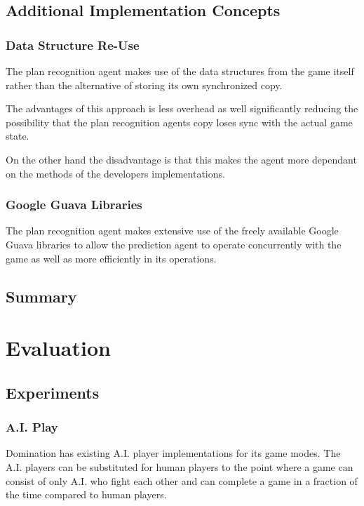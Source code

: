 \documentclass[parskip]{cs4rep}
\begin{document}
\section{Additional Implementation Concepts}

\subsection{Data Structure Re-Use}

The plan recognition agent makes use of the data structures from the game itself rather than the alternative of storing its own synchronized copy.

The advantages of this approach is less overhead as well significantly reducing the possibility that the plan recognition agents copy loses sync with the actual game state. 

On the other hand the disadvantage is that this makes the agent more dependant on the methods of the developers implementations.

\subsection{Google Guava Libraries}

The plan recognition agent makes extensive use of the freely available Google Guava libraries to allow the prediction agent to operate concurrently with the game as well as more efficiently in its operations.

\section{Summary}

\chapter{Evaluation} 

\section{Experiments}

\subsection{A.I. Play}

Domination has existing A.I. player implementations for its game modes. The A.I. players can be substituted for human players to the point where a game can consist of only A.I. who fight each other and can complete a game in a fraction of the time compared to human players. 
\end{document}
